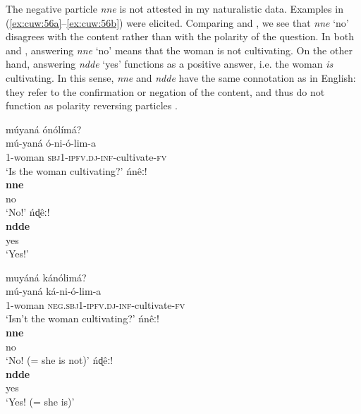 \documentclass[output=paper,colorlinks=true, citecolor=brown,draftmode]{langscibook}
\begin{document}
The negative particle \textit{nne} is not attested in my naturalistic data. Examples in (\ref{ex:cuw:56a}--\ref{ex:cuw:56b}) were elicited. Comparing  and , we see that \textit{nne} ‘no’ disagrees with the content rather than with the polarity of the question. In both  and , answering \textit{nne} ‘no’ means that the woman is not cultivating. On the other hand, answering \textit{ndde} ‘yes’ functions as a positive answer, i.e. the woman \textit{is} cultivating. In this sense, \textit{nne} and \textit{ndde} have the same connotation as in English: they refer to the confirmation or negation of the content, and thus do not function as polarity reversing particles \citep{Holmberg2015}. 

\ea\label{ex:cuw:56a}
    \begin{xlist}[B2: ]
        \label{ex:cuw:56aA} múyaná ónólímá?\\ 
            \gll mú-yaná ó-ni-ó-lim-a\\ 
                  1-woman \textsc{sbj1-ipfv.dj-inf}{}-cultivate-\textsc{fv}\\
            \glt  ‘Is the woman cultivating?'
        \label{ex:cuw:56aB1} ńnêː! \\ 
            \gll \textbf{nne}\\
                    no \\
            \glt ‘No!’
        \label{ex:cuw:56aB2} ńɖêː! \\ 
            \gll  \textbf{ndde}\\
                    yes\\
            \glt ‘Yes!’
    \end{xlist}
\z
\ea\label{ex:cuw:56b}
    \begin{xlist}[B2: ]
        \label{ex:cuw:56bA} muyáná kánólimá? \\ 
            \gll mú-yaná ká-ni-ó-lim-a\\ 
                   1-woman \textsc{neg.sbj1-ipfv.dj-inf}{}-cultivate-\textsc{fv}\\
            \glt  ‘Isn’t the woman cultivating?'
        \label{ex:cuw:56bB1} ńnêː! \\
            \gll   \textbf{nne}\\
                    no \\
            \glt ‘No! (= she is not)’
        \label{ex:cuw:56bB2} ńɖêː! \\ 
            \gll \textbf{ndde}\\
                    yes\\
            \glt ‘Yes! (= she is)’
    \end{xlist}
\z 
\end{document}

